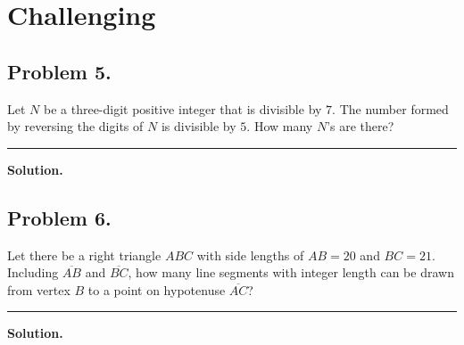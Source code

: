 \documentclass{article}
\newcommand {\MyLine} {
    \smallskip \noindent\rule{\textwidth}{0.4pt} \smallskip
}
\begin{document}
\section*{\textcolor{BrickRed}{Challenging}}
\begin{minipage}[t][0.45\textheight][t]{\textwidth}
\subsection*{Problem 5.} %
{\color {Gray}
Let $N$ be a three-digit positive integer that is
divisible by $7$. The number formed by reversing
the digits of $N$ is divisible by $5$. How many
$N$'s are there?
}

\MyLine

\textbf{Solution.}

\end{minipage}

\begin{minipage}[t][0.45\textheight][t]{\textwidth}
\subsection*{Problem 6.} %
{\color {Gray}
Let there be a right triangle $ABC$ with side lengths
of $AB = 20$ and $BC = 21$. Including $\overline{AB}$
and $\overline{BC}$, how many line segments with
integer length can be drawn from vertex $B$ to a point
on hypotenuse $\overline{AC}$?
}

\MyLine

\textbf{Solution.}

\end{minipage}
\end{document}
